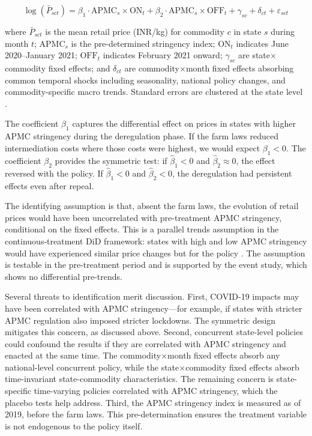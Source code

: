 \documentclass[12pt]{article}
\begin{document}
\begin{equation}
\label{eq:main}
\log(\bar{P}_{sct}) = \beta_1 \cdot \text{APMC}_s \times \text{ON}_t + \beta_2 \cdot \text{APMC}_s \times \text{OFF}_t + \gamma_{sc} + \delta_{ct} + \varepsilon_{sct}
\end{equation}

where $\bar{P}_{sct}$ is the mean retail price (INR/kg) for commodity $c$ in state $s$ during month $t$; $\text{APMC}_s$ is the pre-determined stringency index; $\text{ON}_t$ indicates June 2020--January 2021; $\text{OFF}_t$ indicates February 2021 onward; $\gamma_{sc}$ are state$\times$commodity fixed effects; and $\delta_{ct}$ are commodity$\times$month fixed effects absorbing common temporal shocks including seasonality, national policy changes, and commodity-specific macro trends. Standard errors are clustered at the state level \citep{callaway2021difference}.

The coefficient $\beta_1$ captures the differential effect on prices in states with higher APMC stringency during the deregulation phase. If the farm laws reduced intermediation costs where those costs were highest, we would expect $\beta_1 < 0$. The coefficient $\beta_2$ provides the symmetric test: if $\hat{\beta}_1 < 0$ and $\hat{\beta}_2 \approx 0$, the effect reversed with the policy. If $\hat{\beta}_1 < 0$ and $\hat{\beta}_2 < 0$, the deregulation had persistent effects even after repeal.

The identifying assumption is that, absent the farm laws, the evolution of retail prices would have been uncorrelated with pre-treatment APMC stringency, conditional on the fixed effects. This is a parallel trends assumption in the continuous-treatment DiD framework: states with high and low APMC stringency would have experienced similar price changes but for the policy \citep{callaway2021difference}. The assumption is testable in the pre-treatment period and is supported by the event study, which shows no differential pre-trends.

Several threats to identification merit discussion. First, COVID-19 impacts may have been correlated with APMC stringency---for example, if states with stricter APMC regulation also imposed stricter lockdowns. The symmetric design mitigates this concern, as discussed above. Second, concurrent state-level policies could confound the results if they are correlated with APMC stringency and enacted at the same time. The commodity$\times$month fixed effects absorb any national-level concurrent policy, while the state$\times$commodity fixed effects absorb time-invariant state-commodity characteristics. The remaining concern is state-specific time-varying policies correlated with APMC stringency, which the placebo tests help address. Third, the APMC stringency index is measured as of 2019, before the farm laws. This pre-determination ensures the treatment variable is not endogenous to the policy itself.
\end{document}
